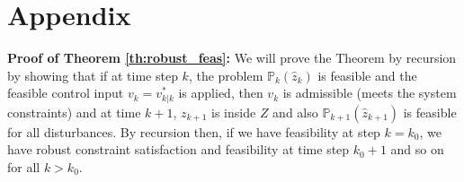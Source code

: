\section*{Appendix}




\textbf{Proof of Theorem \ref{th:robust_feas}:} We will prove the Theorem by recursion by showing that if at time step $k$, the problem $\mathbb{P}_{k}(\hat{z}_k)$ is feasible and the feasible control input $v_k = v^{*}_{k|k}$ is applied, then $v_k$ is admissible (meets the system constraints) and at time $k+1$, $z_{k+1}$ is inside $Z$ and also $\mathbb{P}_{k+1}(\hat{z}_{k+1})$ is feasible for all disturbances. By recursion then, if we have feasibility at step $k=k_0$, we have robust constraint satisfaction and feasibility at time step $k_0+1$ and so on for all $k>k_0$. 

